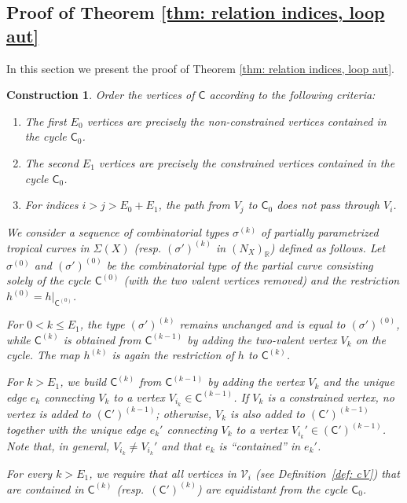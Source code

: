 \documentclass{article}
\newtheorem{construction}[definition]{Construction}
\newcommand{\tropC}{\mathsf{C}}
\begin{document}
\subsection{Proof of Theorem \ref{thm: relation indices, loop aut}}

In this section we present the proof of Theorem \ref{thm: relation indices, loop aut}.

\begin{construction} \label{const: partial-sequence}
  Order the vertices of $\tropC$ according to the following criteria:
\begin{enumerate}
    \item[$\bullet$] The first $E_0$ vertices are precisely the non-constrained vertices contained in the cycle $\tropC_0$.
    \item[$\bullet$] The second $E_1$ vertices are precisely the constrained vertices contained in the cycle $\tropC_0$.
    \item[$\bullet$] For indices $i > j > E_0+E_1$, the path from $V_j$ to $\tropC_0$ does not pass through $V_i$.
\end{enumerate}

We consider a sequence of combinatorial types $\sigma^{(k)}$ of partially parametrized tropical curves in $\Sigma(X)$ (resp. $(\sigma')^{(k)}$ in $(N_X)_\mathbb{R}$) defined as follows. Let $\sigma^{(0)}$ and $(\sigma')^{(0)}$ be the combinatorial type of the partial curve consisting solely of the cycle $\tropC^{(0)}$ (with the two valent vertices removed) and the restriction $h^{(0)} = h|_{\tropC^{(0)}}$. 

For $0 < k \leq E_1$, the type $(\sigma')^{(k)}$ remains unchanged and is equal to $(\sigma')^{(0)}$, while $\tropC^{(k)}$ is obtained from $\tropC^{(k-1)}$ by adding the two-valent vertex $V_k$ on the cycle. The map $h^{(k)}$ is again the restriction of $h$ to $\tropC^{(k)}$.


For $k>E_1$, we build $\tropC^{(k)}$ from $\tropC^{(k-1)}$ by adding the vertex $V_k$ and the unique edge $e_k$ connecting $V_k$ to a vertex $V_{i_k} \in \tropC^{(k-1)}$. If $V_k$ is a constrained vertex, no vertex is added to $(\tropC')^{(k-1)}$; otherwise, $V_k$ is also added to $(\tropC')^{(k-1)}$ together with the unique edge $e_k'$ connecting $V_k$ to a vertex $V_{i_k}' \in (\tropC')^{(k-1)}$. Note that, in general, $V_{i_k} \neq V_{i_k}'$ and that $e_k$ is ``contained'' in $e_k'$.

For every $k > E_1$, we require that all vertices in $\mathcal{V}_i$ (see Definition~\ref{def: cV}) that are contained in $\tropC^{(k)}$ (resp.\ $(\tropC')^{(k)}$) are equidistant from the cycle $\tropC_0$.


\end{construction}
\end{document}
